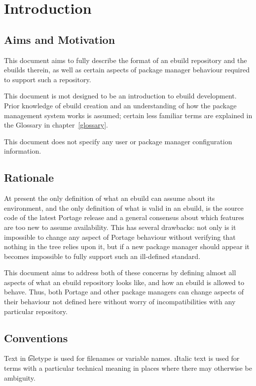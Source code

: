 \chapter{Introduction}

\section{Aims and Motivation}

This document aims to fully describe the format of an ebuild repository and the ebuilds therein, as
well as certain aspects of package manager behaviour required to support such a repository.

This document is \i{not} designed to be an introduction to ebuild development. Prior knowledge of
ebuild creation and an understanding of how the package management system works is assumed; certain
less familiar terms are explained in the Glossary in chapter~\ref{glossary}.

This document does not specify any user or package manager configuration information.

\section{Rationale}

At present the only definition of what an ebuild can assume about its environment,
and the only definition of what is valid in an ebuild, is the source code of the latest Portage release
and a general consensus about which features are too new to assume availability. This has several
drawbacks: not only is it impossible to change any aspect of Portage behaviour without verifying
that nothing in the tree relies upon it, but if a new package manager should appear it becomes
impossible to fully support such an ill-defined standard.

This document aims to address both of these concerns by defining almost all aspects of what an
ebuild repository looks like, and how an ebuild is allowed to behave. Thus, both Portage and other
package managers can change aspects of their behaviour not defined here without worry of
incompatibilities with any particular repository.

\section{Conventions}

Text in \t{teletype} is used for filenames or variable names. \i{Italic} text is used for terms
with a particular technical meaning in places where there may otherwise be ambiguity.

